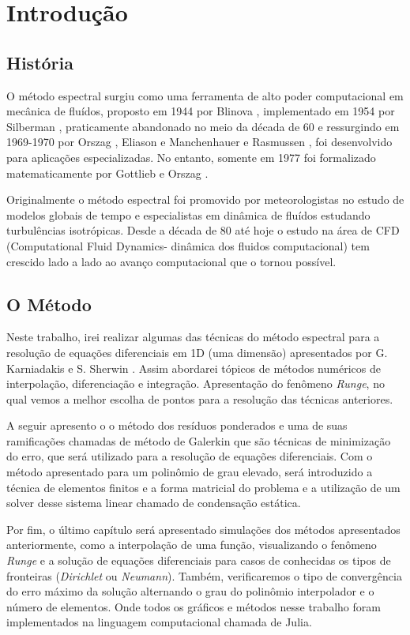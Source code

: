 \chapter{Introdução}
\label{cap:introducao}
\section{História}
O método espectral surgiu como uma ferramenta de alto poder computacional em mecânica de fluídos, proposto em 1944 por Blinova \cite{blinova1944}, implementado em 1954 por Silberman \cite{silberman}, praticamente abandonado no meio da década de 60 e ressurgindo em 1969-1970 por Orszag \cite{Orszag70}, Eliason e Manchenhauer  e Rasmussen \cite{eliasenauermussen}, foi desenvolvido para aplicações especializadas. No entanto,  somente em 1977 foi formalizado matematicamente por Gottlieb e Orszag \cite{Orslieb77}.

Originalmente o método espectral foi promovido por meteorologistas no estudo de modelos globais de tempo e especialistas em dinâmica de fluídos estudando turbulências isotrópicas. Desde a década de 80 até hoje o  estudo na área de CFD (Computational Fluid Dynamics- dinâmica dos fluidos computacional) tem crescido lado a lado ao avanço computacional que o tornou possível.
\section{O Método}
 Neste trabalho, irei realizar algumas das técnicas do método espectral para a resolução de equações diferenciais em 1D (uma dimensão) apresentados por G. Karniadakis e S. Sherwin \citep{book:karniadakis}. Assim abordarei tópicos de métodos numéricos  de interpolação, diferenciação e integração. Apresentação do fenômeno \emph{Runge}, no qual vemos a melhor escolha de pontos para a resolução das técnicas anteriores.
 
 A seguir apresento o o método dos resíduos ponderados e uma de suas ramificações chamadas de  método de Galerkin que são técnicas de minimização do erro, que será utilizado para a resolução de equações diferenciais. Com o método apresentado para um polinômio de grau elevado, será introduzido a técnica de elementos finitos e a forma matricial do problema e a utilização de um solver desse sistema linear chamado de condensação estática.
 
 Por fim, o último capítulo será apresentado simulações dos métodos apresentados anteriormente, como a interpolação de uma função, visualizando o fenômeno \emph{Runge} e a solução de equações diferenciais para casos de conhecidas os tipos de fronteiras (\emph{Dirichlet} ou \emph{Neumann}). Também, verificaremos o tipo de convergência do erro máximo da solução alternando o grau do polinômio interpolador e o número de elementos. Onde todos os gráficos e métodos nesse trabalho foram implementados na linguagem computacional chamada de Julia.
  
